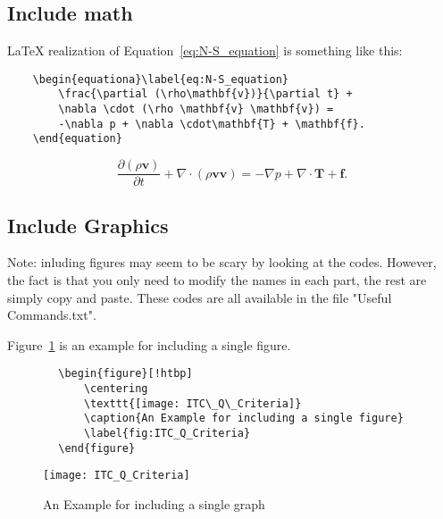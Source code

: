 \subsection{Include math} %
\LaTeX{} realization of Equation~\ref{eq:N-S_equation} is something like this:
\begin{center}
    \small
    \begin{verbatim}
    \begin{equationa}\label{eq:N-S_equation}
        \frac{\partial (\rho\mathbf{v})}{\partial t} +
        \nabla \cdot (\rho \mathbf{v} \mathbf{v}) =
        -\nabla p + \nabla \cdot\mathbf{T} + \mathbf{f}. 
    \end{equation}    
\end{verbatim}
\end{center}

\begin{equation}\label{eq:N-S_equation}
    \frac{\partial (\rho\mathbf{v})}{\partial t} + \nabla \cdot (\rho \mathbf{v} \mathbf{v}) = -\nabla p + \nabla \cdot\mathbf{T} + \mathbf{f}. 
\end{equation}    

\subsection{Include Graphics} %
Note: inluding figures may seem to be scary by looking at the codes. However, the fact is that you only need to modify the names in each part, the rest are simply copy and paste. These codes are all available in the file "Useful Commands.txt".

Figure~\ref{fig:ITC_Q_Criteria} is an example for including a single figure.
\begin{center}
    \small
    \begin{verbatim}
        \begin{figure}[!htbp]
            \centering
            \texttt{[image: ITC\_Q\_Criteria]}
            \caption{An Example for including a single figure}
            \label{fig:ITC_Q_Criteria}
        \end{figure}
    \end{verbatim}
\end{center}

\begin{figure}[!htbp]
    \centering
    \texttt{[image: ITC\_Q\_Criteria]}
    \caption{An Example for including a single graph}
    \label{fig:ITC_Q_Criteria}
\end{figure}

